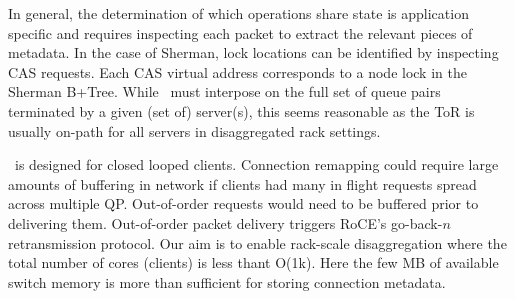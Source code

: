 

In
general, the determination of which operations share state is application
specific and requires inspecting each packet to extract the relevant pieces
of metadata. In the case of Sherman, lock locations can be identified by
inspecting CAS requests. Each CAS virtual address corresponds to a node lock in
the Sherman B+Tree.
While \sword\ must interpose on the full set of queue pairs terminated
by a given (set of) server(s),
this seems reasonable as the ToR is usually on-path for all servers in disaggregated rack settings.

\sword\ is designed for closed looped clients. Connection
remapping could require large amounts of buffering in
network if clients had many in flight requests spread across
multiple QP. Out-of-order requests would need to be buffered
prior to delivering them. Out-of-order packet delivery
triggers RoCE's go-back-$n$ retransmission protocol.
Our aim is to enable rack-scale disaggregation where the
total number of cores (clients) is less thant O(1k). Here
the few MB of available switch memory is more than
sufficient for storing connection metadata.


%

